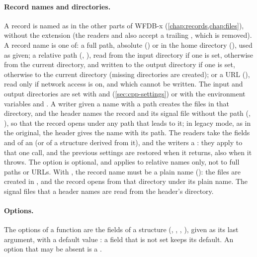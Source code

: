 \paragraph{Record names and directories.} A record is named as in the other parts of
WFDB-x (\cref{chap:records,chap:files}), without the  extension (the readers
and  also accept a trailing , which is removed). A record name is
one of: a full path, absolute () or in the home directory
(), used as given; a relative path
(, ), read from the input directory if one is set,
otherwise from the current directory, and written to the output directory if one is set,
otherwise to the current directory (missing directories are created); or a URL
(), read only if network access is
on, and which cannot be written. The input and output directories are set with
 and 
(\cref{sec:cpp-settings}) or with the environment variables  and
. A writer given a name with a path creates the files in that
directory, and the header names the record and its signal file without the path
(, ), so that the record opens under any path that leads to it;
in legacy mode, as in the original, the header gives the name with its path. The readers
take the fields  and  of an  (or of a
structure derived from it), and the writers a : they apply to that one call,
and the previous settings are restored when it returns, also when it throws. The
 option is optional, and applies to relative names only, not to full
paths or URLs. With , the record name must be a plain name (): the
files are created in , and the record opens from that directory under its plain
name. The signal files that a header names are read from the header's directory.

\paragraph{Options.} The options of a function are the fields of a structure
(, , , ),
given as its last argument, with a default value \code{\{\}}: a field that is not set
keeps its default. An option that may be absent is a .

